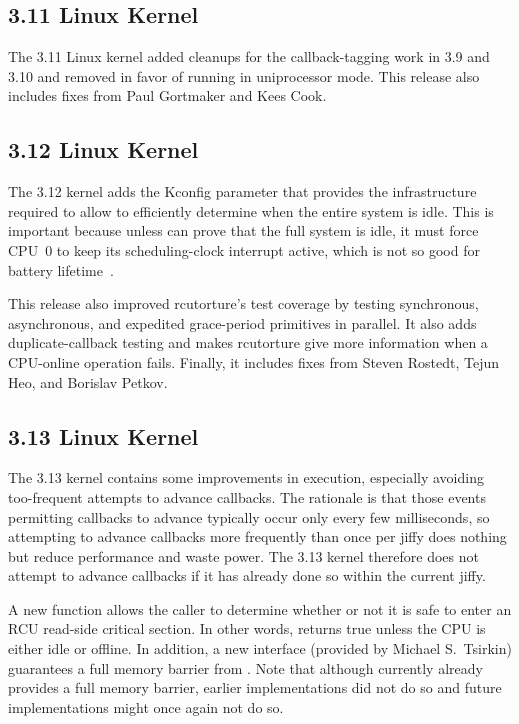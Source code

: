 \subsection{3.11 Linux Kernel}

The 3.11 Linux kernel added cleanups for the callback-tagging work
in 3.9 and 3.10 and removed  in favor of running
 in uniprocessor mode.
This release also includes fixes from Paul Gortmaker and Kees Cook.

\subsection{3.12 Linux Kernel}

The 3.12 kernel adds the  Kconfig
parameter that provides the infrastructure required to allow
 to efficiently determine when the entire
system is idle.
This is important because unless  can prove
that the full system is idle, it must force CPU~0 to keep its
scheduling-clock interrupt active, which is not so good for battery
lifetime~\cite{JonathanCorbet2013SYSIDLE}.

This release also improved rcutorture's test coverage by testing
synchronous, asynchronous, and expedited grace-period primitives
in parallel.
It also adds duplicate-callback testing and makes rcutorture give
more information when a CPU-online operation fails.
Finally, it includes fixes from Steven Rostedt, Tejun Heo, and Borislav
Petkov.

\subsection{3.13 Linux Kernel}

The 3.13 kernel contains some improvements in 
execution, especially avoiding too-frequent attempts to advance callbacks.
The rationale is that those events permitting callbacks to advance
typically occur only every few milliseconds, so attempting to advance callbacks
more frequently than once per jiffy does nothing but reduce performance and
waste power.
The 3.13 kernel therefore does not attempt to advance callbacks if it
has already done so within the current jiffy.

A new  function allows the caller to determine
whether or not it is safe to enter an RCU read-side critical section.
In other words,  returns true unless the CPU is
either idle or offline.
In addition, a new 
interface (provided by Michael S.~Tsirkin)
guarantees a full memory barrier from .
Note that although  currently already provides
a full memory barrier, earlier implementations did not do so and
future implementations might once again not do so.

